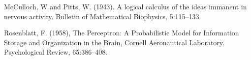 \documentclass[12pt]{article}
\begin{document}
\begin{thebibliography}{10}


McCulloch, W and Pitts, W. (1943). A logical calculus of the ideas immanent in nervous activity. 
\newblock Bulletin of Mathematical Biophysics, 5:115--133. 

  
Rosenblatt, F. (1958), The Perceptron: A Probabilistic Model for Information Storage and Organization in the Brain, Cornell Aeronautical Laboratory.
\newblock Psychological Review, 65:386--408.


\end{thebibliography}
\end{document}
